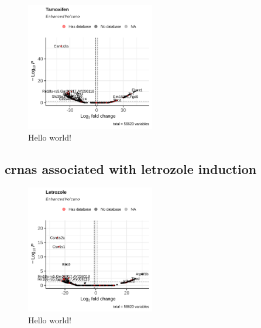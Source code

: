 \begin{figure}[ht]
    \centering

    \includegraphics[width=0.5\textwidth]{chapters/4_results_and_discussion/figures/dea/deseq2/tamoxifen/volcano.png}
    \caption{Hello world!
    }
    \label{fig:tamoxifen_volcano}
\end{figure}

\subsection{\Glspl{crna} associated with letrozole induction}

\begin{figure}[ht]
    \centering

    \includegraphics[width=0.5\textwidth]{chapters/4_results_and_discussion/figures/dea/deseq2/letrozole/volcano.png}
    \caption{Hello world!
    }
    \label{fig:letrozole_volcano}
\end{figure}
